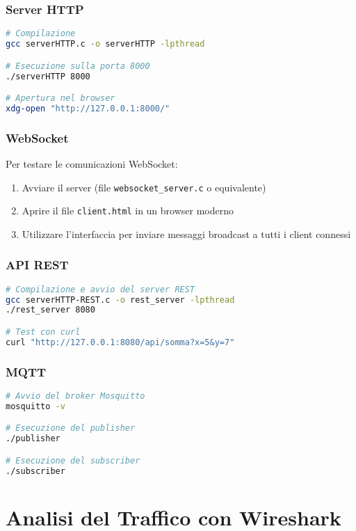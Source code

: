 \documentclass[12pt,a4paper]{article}
\begin{document}
\subsubsection{Server HTTP}
\begin{lstlisting}[language=bash, caption=Avvio server HTTP]
# Compilazione
gcc serverHTTP.c -o serverHTTP -lpthread

# Esecuzione sulla porta 8000
./serverHTTP 8000

# Apertura nel browser
xdg-open "http://127.0.0.1:8000/"
\end{lstlisting}

\subsubsection{WebSocket}
Per testare le comunicazioni WebSocket:
\begin{enumerate}
    \item Avviare il server (file \texttt{websocket\_server.c} o equivalente)
    \item Aprire il file \texttt{client.html} in un browser moderno
    \item Utilizzare l'interfaccia per inviare messaggi broadcast a tutti i client connessi
\end{enumerate}

\subsubsection{API REST}
\begin{lstlisting}[language=bash, caption=Test API REST]
# Compilazione e avvio del server REST
gcc serverHTTP-REST.c -o rest_server -lpthread
./rest_server 8080

# Test con curl
curl "http://127.0.0.1:8080/api/somma?x=5&y=7"
\end{lstlisting}

\subsubsection{MQTT}
\begin{lstlisting}[language=bash, caption=Test protocollo MQTT]
# Avvio del broker Mosquitto
mosquitto -v

# Esecuzione del publisher
./publisher

# Esecuzione del subscriber
./subscriber
\end{lstlisting}

\section{Analisi del Traffico con Wireshark}
\end{document}
